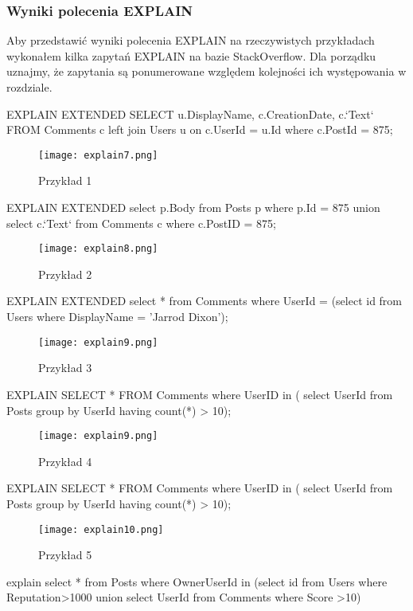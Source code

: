 \subsubsection{Wyniki polecenia EXPLAIN}
Aby przedstawić wyniki polecenia EXPLAIN na rzeczywistych przykładach wykonałem kilka zapytań EXPLAIN na bazie StackOverflow. Dla porządku uznajmy, że zapytania są ponumerowane względem kolejności ich występowania w rozdziale.
\begin{spverbatim}
	EXPLAIN EXTENDED SELECT u.DisplayName, c.CreationDate, c.`Text` FROM  Comments c left join Users u on c.UserId = u.Id where c.PostId = 875;
\end{spverbatim}
\begin{figure}[H]
	\texttt{[image: explain7.png]} 
	\caption{Przykład 1}
\end{figure}
\begin{spverbatim}
	EXPLAIN EXTENDED select p.Body from Posts p where p.Id = 875 union
	select c.`Text` from Comments c where c.PostID = 875;
\end{spverbatim}
\begin{figure}[H]
	\texttt{[image: explain8.png]} 
	\caption{Przykład 2}
\end{figure}
\begin{spverbatim}
	EXPLAIN EXTENDED select * from Comments where UserId = (select id from Users where DisplayName = 'Jarrod Dixon');
\end{spverbatim}
\begin{figure}[H]
	\texttt{[image: explain9.png]} 
	\caption{Przykład 3}
\end{figure}
\begin{spverbatim}
	EXPLAIN SELECT * FROM Comments where UserID in ( select UserId from Posts group by UserId having count(*) > 10);
\end{spverbatim}
\begin{figure}[H]
	\texttt{[image: explain9.png]} 
	\caption{Przykład 4}
\end{figure}
\begin{spverbatim}
	EXPLAIN SELECT * FROM Comments where UserID in ( select UserId from Posts group by UserId having count(*) > 10);
\end{spverbatim}
\begin{figure}[H]
	\texttt{[image: explain10.png]} 
	\caption{Przykład 5}
\end{figure}
\begin{spverbatim}
	explain select * from Posts  where OwnerUserId in (select id from Users where Reputation>1000 union select UserId from Comments where Score >10)
\end{spverbatim}
